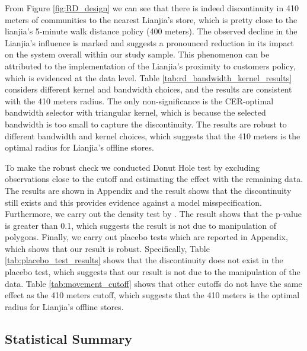 \documentclass[11pt]{article}
\begin{document}


From Figure \ref{fig:RD_design} we can see that there is indeed discontinuity in 410 meters of communities to the nearest Lianjia's store, which is pretty close to the lianjia's 5-minute walk distance policy (400 meters). The observed decline in the Lianjia's influence is marked and suggests a pronounced reduction in its impact on the system overall within our study sample. This phenomenon can be attributed to the implementation of the Lianjia's proximity to customers policy, which is evidenced at the data level. Table \ref{tab:rd_bandwidth_kernel_results} considers different kernel and bandwidth choices, and the results are consistent with the 410 meters radius. The only non-significance is the CER-optimal bandwidth selector with triangular kernel, which is because the selected bandwidth is too small to capture the discontinuity. The results are robust to different bandwidth and kernel choices, which suggests that the 410 meters is the optimal radius for Lianjia's offline stores.

To make the robust check we conducted Donut Hole test by excluding observations close to the cutoff and estimating the effect with the remaining data. The results are shown in Appendix and the result shows that the discontinuity still exists and this provides evidence against a model misspecification. Furthermore, we carry out the density test by \citep{MCCRARY2008698}. The result shows that the p-value is greater than 0.1, which suggests the result is not due to manipulation of polygons. Finally, we carry out placebo tests which are reported in Appendix, which shows that our result is robust. Specifically, Table \ref{tab:placebo_test_results} shows that the discontinuity does not exist in the placebo test, which suggests that our result is not due to the manipulation of the data. Table \ref{tab:movement_cutoff} shows that other cutoffs do not have the same effect as the 410 meters cutoff, which suggests that the 410 meters is the optimal radius for Lianjia's offline stores.

\subsection{Statistical Summary} \label{subsec:Statistical_Summary}
\end{document}
